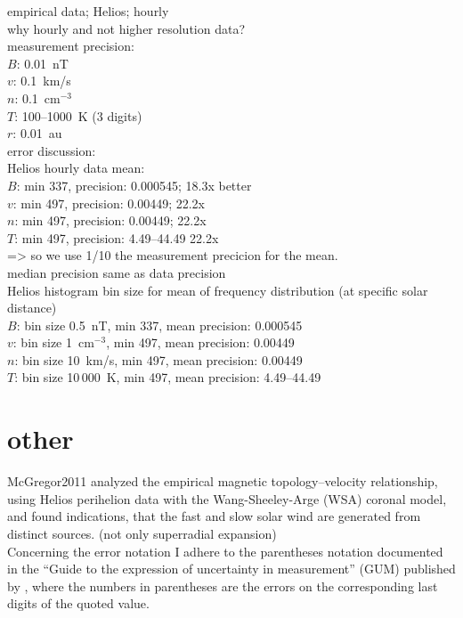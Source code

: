 empirical data; Helios; hourly\\
why hourly and not higher resolution data?\\
measurement precision:\\
$B$: 0.01~nT\\
$v$: 0.1~km/s\\
$n$: 0.1~cm$^{-3}$\\
$T$: 100--1000~K (3 digits)\\
$r$: 0.01~au\\

error discussion:\\
Helios hourly data mean:\\
$B$: min 337, precision: 0.000545; 18.3x better\\
$v$: min 497, precision: 0.00449; 22.2x\\
$n$: min 497, precision:  0.00449; 22.2x\\
$T$: min 497, precision: 4.49--44.49 22.2x\\
=> so we use 1/10 the measurement precicion for the mean.\\

median precision same as data precision\\

Helios histogram bin size for mean of frequency distribution (at specific solar distance)\\
$B$: bin size 0.5~nT, min 337, mean precision: 0.000545\\
$v$: bin size 1~cm$^{-3}$, min 497, mean precision: 0.00449\\
$n$: bin size 10~km/s, min 497, mean precision:  0.00449\\
$T$: bin size 10\,000~K, min 497, mean precision: 4.49--44.49\\

\section{other}
McGregor2011 analyzed the empirical magnetic topology–velocity relationship, using Helios perihelion data with the Wang-Sheeley-Arge (WSA) coronal model, and found indications, that the fast and slow solar wind are generated from distinct sources. (not only superradial expansion)\\

Concerning the error notation I adhere to the parentheses notation documented in the ``Guide to the expression of uncertainty in measurement'' (GUM) published by \citet{GUM2008}, where the numbers in parentheses are the errors on the corresponding last digits of the quoted value.\\


